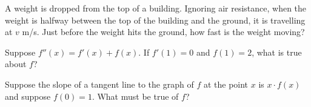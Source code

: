 \documentclass{ximera}
\newcommand{\recommendation}[1]{}
\begin{document}


\begin{problem}
  A weight is dropped from the top of a building.  Ignoring air
  resistance, when the weight is halfway between the top of the
  building and the ground, it is travelling at $v$ m/s.  Just before
  the weight hits the ground, how fast is the weight moving?
  \begin{multipleChoice}
  \end{multipleChoice}
\end{problem}



\begin{problem}
  Suppose $f''(x) = f'(x) + f(x)$.  If $f'(1) = 0$ and $f(1) = 2$, what is true about $f$?
  \begin{multipleChoice}
  \end{multipleChoice}
\end{problem}

\begin{problem}
  Suppose the slope of a tangent line to the graph of $f$ at the point $x$ is $x \cdot f(x)$ and suppose $f(0) = 1$.  What must be true of $f$?
  \begin{multipleChoice}
  \end{multipleChoice}
\end{problem}


\end{document}
